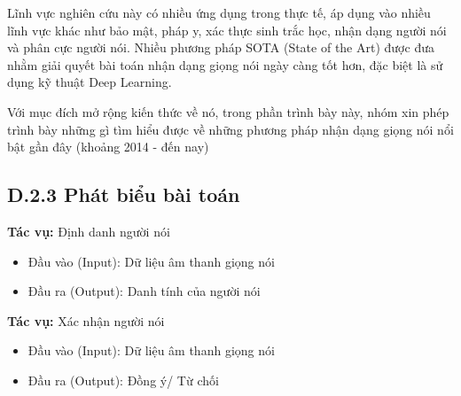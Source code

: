 \documentclass{article}
\begin{document}
	Lĩnh vực nghiên cứu này có nhiều ứng dụng trong thực tế, áp dụng vào nhiều lĩnh vực khác như bảo mật, pháp y, xác thực sinh trắc học, nhận dạng người nói và phân cực người nói. Nhiều phương pháp SOTA (State of the Art) được đưa nhằm giải quyết bài toán nhận dạng giọng nói ngày càng tốt hơn, đặc biệt là sử dụng kỹ thuật Deep Learning. 
	
	Với mục đích mở rộng kiến thức về nó, trong phần trình bày này, nhóm xin phép trình bày những gì tìm hiểu được về những phương pháp nhận dạng giọng nói nổi bật gần đây (khoảng 2014 - đến nay) 
	
	\subsection{D.2.3 Phát biểu bài toán}
	\textbf{Tác vụ:} Định danh người nói
	\begin{itemize}
		\item Đầu vào (Input): Dữ liệu âm thanh giọng nói
		\item Đầu ra (Output): Danh tính của người nói
	\end{itemize}
	\textbf{Tác vụ:} Xác nhận người nói
	\begin{itemize}
		\item Đầu vào (Input): Dữ liệu âm thanh giọng nói
		\item Đầu ra (Output): Đồng ý/ Từ chối
	\end{itemize}
\end{document}
